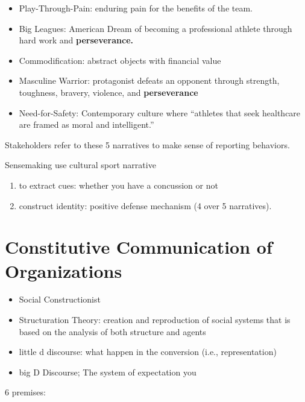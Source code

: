 \documentclass[
]{book}
\providecommand{\tightlist}{%
  \setlength{\itemsep}{0pt}\setlength{\parskip}{0pt}}
\begin{document}
\begin{itemize}
\tightlist
\item
  Play-Through-Pain: enduring pain for the benefits of the team.
\item
  Big Leagues: American Dream of becoming a professional athlete through hard work and \textbf{perseverance.}
\item
  Commodification: abstract objects with financial value
\item
  Masculine Warrior: protagonist defeats an opponent through strength, toughness, bravery, violence, and
  \textbf{perseverance}
\item
  Need-for-Safety: Contemporary culture where ``athletes that seek healthcare are framed as moral and intelligent.''
\end{itemize}

Stakeholders refer to these 5 narratives to make sense of reporting behaviors.

Sensemaking use cultural sport narrative

\begin{enumerate}
\def\labelenumi{\arabic{enumi}.}
\tightlist
\item
  to extract cues: whether you have a concussion or not
\item
  construct identity: positive defense mechanism (4 over 5 narratives).
\end{enumerate}

\hypertarget{constitutive-communication-of-organizations}{%
\chapter{Constitutive Communication of Organizations}\label{constitutive-communication-of-organizations}}

\begin{itemize}
\tightlist
\item
  Social Constructionist
\item
  Structuration Theory: creation and reproduction of social systems that is based on the analysis of both structure
  and agents
\item
  little d discourse: what happen in the conversion (i.e., representation)
\item
  big D Discourse; The system of expectation you
\end{itemize}

\citep{Schoeneborn_2017}

6 premises:
\end{document}

